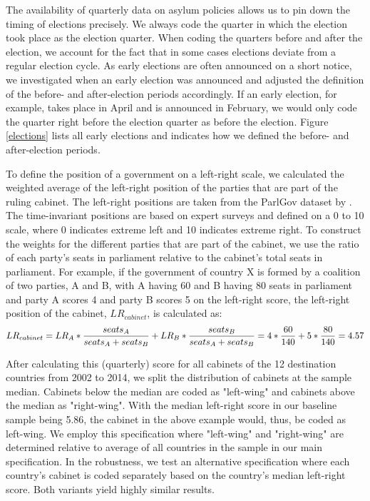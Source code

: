 \documentclass[a4paper,12pt]{article}
\begin{document}
 

The availability of quarterly data on asylum policies allows us to pin down the timing of elections precisely. We always code the quarter in which the election took place as the election quarter. When coding the quarters before and after the election, we account for the fact that in some cases elections deviate from a regular election cycle. As early elections are often announced on a short notice, we investigated when an early election was announced and adjusted the definition of the before- and after-election periods accordingly. If an early election, for example, takes place in April and is announced in February, we would only code the quarter right before the election quarter as before the election. Figure \ref{elections} lists all early elections and indicates how we defined the before- and after-election periods.

To define the position of a government on a left-right scale, we calculated the weighted average of the left-right position of the parties that are part of the ruling cabinet. The left-right positions are taken from the ParlGov dataset by \citet{parlgov2016}. The time-invariant positions are based on expert surveys and defined on a 0 to 10 scale, where 0 indicates extreme left and 10 indicates extreme right. To construct the weights for the different parties that are part of the cabinet, we use the ratio of each party's seats in parliament relative to the cabinet's total seats in parliament. For example, if the government of country X is formed by a coalition of two parties, A and B, with A having 60 and B having 80 seats in parliament and party A scores 4 and party B scores 5 on the left-right score, the left-right position of the cabinet, $LR_{cabinet}$, is calculated as: 
\begin{equation*}
\tiny
LR_{cabinet} = LR_{A} * \frac{seats_{A}}{seats_{A} + seats_{B}} +LR_{B} * \frac{seats_{B}}{seats_{A} + seats_{B}} = 4*\frac{60}{140} +5*\frac{80}{140} = 4.57
\end{equation*}

After calculating this (quarterly) score for all cabinets of the 12 destination countries from 2002 to 2014, we split the distribution of cabinets at the sample median. Cabinets below the median are coded as "left-wing" and cabinets above the median as "right-wing". With the median left-right score in our baseline sample being 5.86, the cabinet in the above example would, thus, be coded as left-wing. We employ this specification where "left-wing" and "right-wing" are determined relative to average of all countries in the sample in our main specification. In the robustness, we test an alternative specification where each country's cabinet is coded separately based on the country's median left-right score. Both variants yield highly similar results. 
\end{document}
